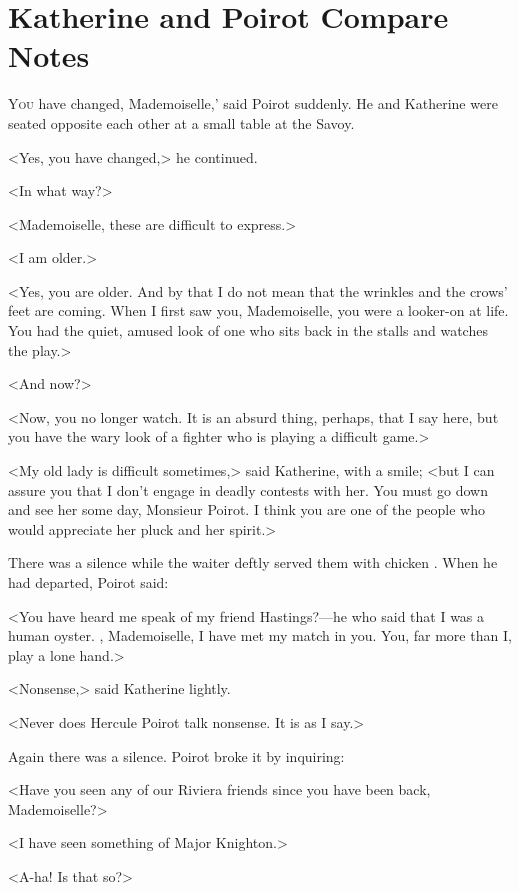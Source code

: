 \chapter{Katherine and Poirot Compare Notes}



\lettrine[ante=`]{Y}{ou}  have changed, Mademoiselle,' said Poirot suddenly. He and Katherine were seated opposite each other at a small table at the Savoy.

\zz
<Yes, you have changed,> he continued.

<In what way?>

<Mademoiselle, these  are difficult to express.>

<I am older.>

<Yes, you are older. And by that I do not mean that the wrinkles and the crows' feet are coming. When I first saw you, Mademoiselle, you were a looker-on at life. You had the quiet, amused look of one who sits back in the stalls and watches the play.>

<And now?>

<Now, you no longer watch. It is an absurd thing, perhaps, that I say here, but you have the wary look of a fighter who is playing a difficult game.>

<My old lady is difficult sometimes,> said Katherine, with a smile; <but I can assure you that I don't engage in deadly contests with her. You must go down and see her some day, Monsieur Poirot. I think you are one of the people who would appreciate her pluck and her spirit.>

There was a silence while the waiter deftly served them with chicken . When he had departed, Poirot said:

<You have heard me speak of my friend Hastings?—he who said that I was a human oyster. , Mademoiselle, I have met my match in you. You, far more than I, play a lone hand.>

<Nonsense,> said Katherine lightly.

<Never does Hercule Poirot talk nonsense. It is as I say.>

Again there was a silence. Poirot broke it by inquiring:

<Have you seen any of our Riviera friends since you have been back, Mademoiselle?>

<I have seen something of Major Knighton.>

<A-ha! Is that so?>

